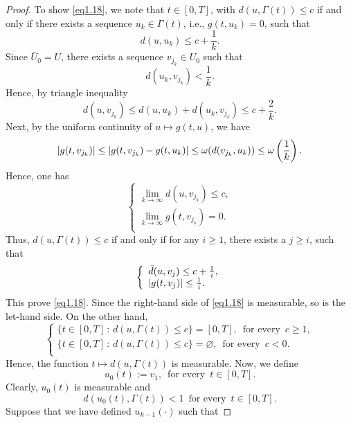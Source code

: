 \begin{proof}
        To show \cref{eq1.18}, we note that $t\in [0,T]$, with $d(u,\Gamma(t))\leq c$ 
        if and only if there exists a sequence $u_k \in \Gamma(t)$, i.e., $g(t,u_k)=0$, 
        such that
        $$
            d(u,u_k)\leq c+\frac{1}{k}.
        $$
        Since $\bar{U}_0=U$, there exists a sequence $v_{j_k} \in U_0$ such that 
        $$
            d(u_k,v_{j_k})<\frac{1}{k}.
        $$
        Hence, by triangle inequality
        $$
            d(u,v_{j_k}) \leq d(u,u_k)+d(u_k,v_{j_k}) \leq c + \frac{2}{k}.
        $$
        Next, by the uniform continuity of $u\mapsto g(t,u)$, we have
        $$
            \abs{g(t,v_{j_k})} \leq \abs{g(t,v_{j_k})-g(t,u_k)} \leq \omega(d(v_{j_k},u_k)) %
            \leq \omega \left(\frac{1}{k}\right).
        $$
        Hence, one has
        $$
        \left\{ 
        \begin{array}{l}
        	\lim_{k\to \infty} d(u,v_{j_k})\leq c, \\
            \lim_{k\to \infty} g(t,v_{j_k})=0. \\
        \end{array}
        \right.
        $$
        Thus, $d(u,\Gamma(t))\leq c$ if and only if for any $i\geq 1$, there exists a 
        $j\geq i$, such that
        $$
        \left\{ 
        \begin{array}{l}
            \bar{d}(u,v_{j})\leq c + \frac{1}{i}, \\
            \left\lvert g(t,v_{j})\right\rvert \leq \frac{1}{i}. \\
        \end{array}
        \right.
        $$
        This prove \cref{eq1.18}. Since the right-hand side of \cref{eq1.18} is 
        measurable, so is the let-hand side. On the other hand,
        $$
            \left\{ \begin{array}{l}
            \{t\in[0,T] \, : \, d(u,\Gamma(t))\leq c\}=[0,T], \, %
                \mbox{ for every }\, c\geq 1, \\
            \{t\in[0,T] \, : \, d(u,\Gamma(t))\leq c\}=\varnothing, \, %
                \mbox{ for every }\, c<0. \\
            \end{array}
            \right.
        $$
        Hence, the function $t \mapsto d(u,\Gamma(t))$ is measurable. Now, we define
        $$
            u_0(t):=v_1,\,\mbox{ for every }\, t\in [0,T].
        $$
        Clearly, $u_0(t)$ is measurable and 
        $$
            d(u_0(t),\Gamma(t))<1\,\mbox{ for every }\,t\in[0,T].
        $$
        Suppose that we have defined $u_{k-1}(\cdot)$ such that 

\end{proof}
